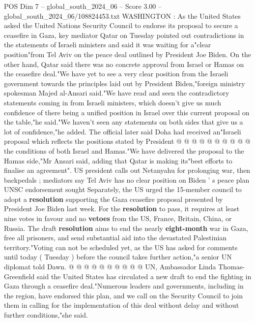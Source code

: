 \begin{textsample}{POS Dim 7 – global\_south\_2024\_06 – Score 3.00 – global\_south\_2024\_06/108824453.txt}  \label{ex:f7_pos_080}
WASHINGTON : As the United States asked the United Nations Security Council to endorse its proposal to secure a ceasefire in Gaza, key mediator Qatar on Tuesday pointed out contradictions in the statements of Israeli ministers and said it was waiting for a"clear position"from Tel Aviv on the peace deal outlined by President Joe Biden.
On the other hand, Qatar said there was no concrete approval from Israel or Hamas on the ceasefire deal."We have yet to see a very clear position from the Israeli government towards the principles laid out by President Biden,"foreign ministry spokesman Majed al-Ansari said."We have read and seen the contradictory statements coming in from Israeli ministers, which doesn't give us much confidence of there being a unified position in Israel over this current proposal on the table,"he said."We haven't seen any statements on both sides that give us a lot of confidence,"he added.
The official later said Doha had received an"Israeli proposal which reflects the positions stated by President @ @ @ @ @ @ @ @ @ @ the conditions of both Israel and Hamas."We have delivered the proposal to the Hamas side,"Mr Ansari said, adding that Qatar is making its"best efforts to finalise an agreement".
US president calls out Netanyahu for prolonging war, then backpedals ; mediators say Tel Aviv has no clear position on Biden ' s peace plan UNSC endorsement sought Separately, the US urged the 15-member council to adopt a \textbf{resolution} supporting the Gaza ceasefire proposal presented by President Joe Biden last week.
For the \textbf{resolution} to pass, it requires at least nine votes in favour and no \textbf{vetoes} from the US, France, Britain, China, or Russia.
The draft \textbf{resolution} aims to end the nearly \textbf{eight-month} war in Gaza, free all prisoners, and send substantial aid into the devastated Palestinian territory."Voting can not be scheduled yet, as the US has asked for comments until today ( Tuesday ) before the council takes further action,"a senior UN diplomat told Dawn. @ @ @ @ @ @ @ @ @ @ UN, Ambassador Linda Thomas-Greenfield said the United States has circulated a new draft to end the fighting in Gaza through a ceasefire deal."Numerous leaders and governments, including in the region, have endorsed this plan, and we call on the Security Council to join them in calling for the implementation of this deal without delay and without further conditions,"she said.

\end{textsample}
